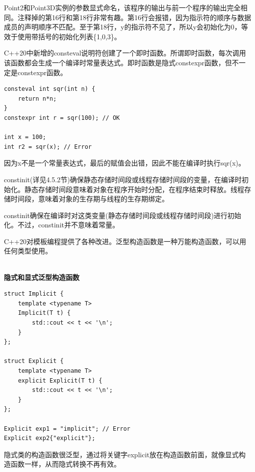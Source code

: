 Point2和Point3D实例的参数显式命名，该程序的输出与前一个程序的输出完全相同。注释掉的第16行和第18行非常有趣。第16行会报错，因为指示符的顺序与数据成员的声明顺序不匹配。至于第18行，y的指示符不见了，所以y会初始化为0，等效于使用带括号的初始化列表\{1,0,3\}。


C++20中新增的consteval说明符创建了一个即时函数。所谓即时函数，每次调用该函数都会生成一个编译时常量表达式。即时函数是隐式constexpr函数，但不一定是constexpr函数。

\begin{lstlisting}[style=styleCXX]
consteval int sqr(int n) {
	return n*n;
}
constexpr int r = sqr(100); // OK

int x = 100;
int r2 = sqr(x); // Error
\end{lstlisting}

因为x不是一个常量表达式，最后的赋值会出错，因此不能在编译时执行sqr(x)。

constinit(详见4.5.2节)确保静态存储时间段或线程存储时间段的变量，在编译时初始化。静态存储时间段意味着对象在程序开始时分配，在程序结束时释放。线程存储时间段，意味着对象的生存期与线程的生存期绑定。

constinit确保在编译时对这类变量(静态存储时间段或线程存储时间段)进行初始化。不过，constinit并不意味着常量。


C++20对模板编程提供了各种改进。泛型构造函数是一种万能构造函数，可以用任何类型使用。

\hspace*{\fill} \\ %
\noindent
\textbf{隐式和显式泛型构造函数}
\begin{lstlisting}[style=styleCXX]
struct Implicit {
	template <typename T>
	Implicit(T t) {
		std::cout << t << '\n';
	}
};

struct Explicit {
	template <typename T>
	explicit Explicit(T t) {
		std::cout << t << '\n';
	}
};

Explicit exp1 = "implicit"; // Error
Explicit exp2{"explicit"};
\end{lstlisting}

隐式类的构造函数很泛型，通过将关键字explicit放在构造函数前面，就像显式构造函数一样，从而隐式转换不再有效。



